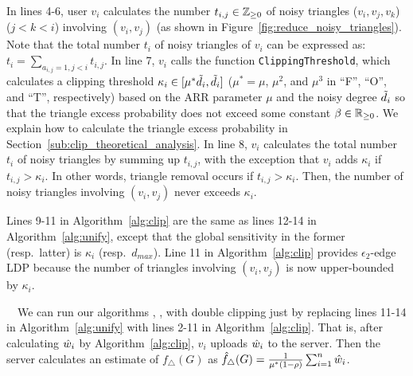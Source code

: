 In lines 4-6, 
user $v_i$ calculates the number $t_{i,j} \in \mathbb{Z}_{\ge0}$ of noisy triangles ($v_i, v_j, v_k$) ($j<k<i$) involving $(v_i,v_j)$ 
(as shown in Figure~\ref{fig:reduce_noisy_triangles}). 
Note that the total number $t_i$ of noisy triangles of $v_i$ can be expressed as: 
$t_i = \sum_{a_{i,j}=1, j<i} t_{i,j}$. 
In line 7, $v_i$ calls the function \texttt{ClippingThreshold}, which calculates a clipping threshold 
$\kappa_i \in [\mu^* \tilde{d}_i, \tilde{d}_i]$ 
($\mu^* = \mu$, $\mu^2$, and $\mu^3$ in 
``F'', ``O'', and ``T'', respectively) 
based on the ARR parameter $\mu$ and the noisy degree $\tilde{d}_i$ so that 
the triangle excess probability does not exceed some constant $\beta \in \mathbb{R}_{\ge0}$. 
We explain how to calculate 
the triangle excess probability 
in Section~\ref{sub:clip_theoretical_analysis}. 
In line 8, $v_i$ calculates the total number $t_i$ of noisy triangles by summing up $t_{i,j}$, with the exception that $v_i$ adds $\kappa_i$ 
if $t_{i,j} > \kappa_i$. 
In other words, triangle removal occurs 
if 
$t_{i,j} > \kappa_i$. 
Then, 
the number 
of noisy triangles involving $(v_i,v_j)$ never exceeds $\kappa_i$. 

Lines 9-11 in Algorithm~\ref{alg:clip} are the same as lines 12-14 in Algorithm~\ref{alg:unify}, except that 
the global sensitivity in the former (resp.~latter) is $\kappa_i$ (resp.~$d_{max}$). 
Line 11 in Algorithm~\ref{alg:clip} provides $\epsilon_2$-edge LDP because the number of triangles involving $(v_i,v_j)$ is now upper-bounded by $\kappa_i$. 

\smallskip
{}~~We can run our algorithms \AlgOne{}, \AlgTwo{}, \AlgThree{} with double clipping just by replacing lines 11-14 in Algorithm~\ref{alg:unify} with lines 2-11 in Algorithm~\ref{alg:clip}. 
That is, after calculating $\hat{w}_i$ by Algorithm~\ref{alg:clip}, $v_i$ uploads $\hat{w}_i$ to the server. 
Then the server calculates an estimate of $f_\triangle(G)$ as $\hat{f}_\triangle(G) = \frac{1}{\mu^*(1-\rho)}\sum_{i=1}^n \hat{w}_i$. 

